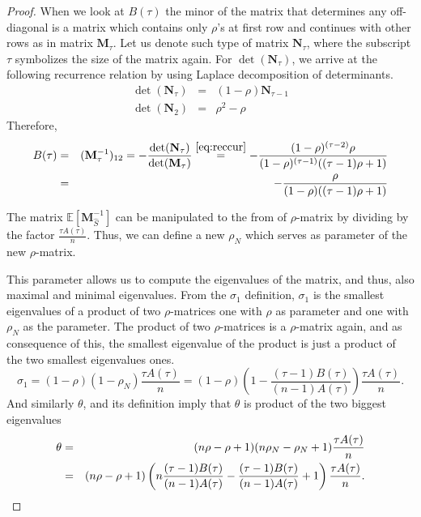 \documentclass[10pt,a4paper]{amsart}
\begin{document}
\begin{proof}
		When we look at $B(\tau)$ the minor of the matrix that determines any off-diagonal is a matrix which contains only $\rho$'s at first row and continues with other rows as in matrix $\mathbf{M}_\tau$. Let us denote such type of matrix $\mathbf{N}_{\tau}$, where the subscript $\tau$ symbolizes the size of the matrix again. For $\det(\mathbf{N}_{\tau})$, we arrive at the following recurrence relation by using Laplace decomposition of determinants.
		\begin{eqnarray} \label{eq:reccur}
			\det(\mathbf{N}_{\tau})& =& (1-\rho)\mathbf{N}_{\tau-1} \\
			\det(\mathbf{N}_{2})& = & \rho^2-\rho
		\end{eqnarray}
		Therefore,
		\begin{eqnarray}
			B(\tau)&=&(\mathbf{M}_{\tau}^{-1})_{12}=-\frac{\det(\mathbf{N}_{\tau})}{\det(\mathbf{M}_{\tau})}\stackrel{\eqref{eq:reccur}}=-\frac{(1-\rho)^{(\tau-2)}\rho}{(1-\rho)^{(\tau-1)}((\tau-1)\rho+1)} \notag \\&= &-\frac{\rho}{(1-\rho)((\tau-1)\rho+1)} 
		\end{eqnarray}
		
		The matrix $\mathbb{E}[\mathbf{M}_{\hat{S}}^{-1}]$ can be manipulated to the from of $\rho$-matrix by dividing by the factor $\frac{\tau A(\tau)}{n}$. Thus, we can define a new $\rho_N$ which serves as parameter of the new $\rho$-matrix. 
		
		This parameter allows us to compute the eigenvalues of the matrix, and thus, also maximal and minimal eigenvalues. From the $\sigma_1$ definition, $\sigma_1$  is the smallest eigenvalues of a product of two $\rho$-matrices one with $\rho$ as parameter and one with $\rho_N$ as the parameter. The product of two $\rho$-matrices is a $\rho$-matrix again, and as consequence of this, the smallest eigenvalue of the product is just a product of the two smallest eigenvalues ones.
		\begin{equation}
			\sigma_1=(1-\rho)(1-\rho_N)\frac{\tau A(\tau)}{n}=(1-\rho)\left(1-\frac{(\tau-1)B(\tau)}{(n-1)A(\tau)}\right)\frac{\tau A(\tau)}{n}.
		\end{equation}
		And similarly $ \theta$, and its definition imply that $ \theta$ is product of the two biggest eigenvalues
		\begin{eqnarray}
			 \theta&=&(n\rho-\rho+1)(n\rho_N-\rho_N+1)\frac{\tau A(\tau)}{n} \notag\\&=&(n\rho-\rho+1)\left(n\frac{(\tau-1)B(\tau)}{(n-1)A(\tau)}-\frac{(\tau-1)B(\tau)}{(n-1)A(\tau)}+1\right)\frac{\tau A(\tau)}{n}	.
		\end{eqnarray}	
	\end{proof}
\end{document}
